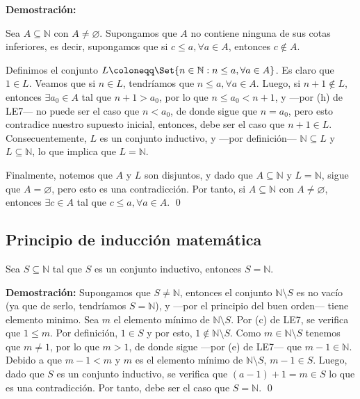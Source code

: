 \documentclass[11pt]{article}
\newcommand{\N}{\mathbb{N}}
\newcommand{\R}{\mathbb{R}}
\let\emptyset\varnothing
\let\set\Set
\begin{document}
\pagebreak

\textbf{Demostración:}

Sea $A\subseteq \N$ con $A\neq \emptyset$. Supongamos que $A$ no contiene ninguna de sus cotas inferiores, es decir, supongamos que si $c\leq a, \forall a\in A$, entonces $c\notin A$.

Definimos el conjunto $L\coloneqq \set{n\in \N: n\leq a, \forall a\in A}$. Es claro que $1\in L$. Veamos que si $n\in L$, tendríamos que $n\leq a, \forall a\in A$. Luego, si $n+1\notin L$, entonces $\exists a_0\in A$ tal que $n+1>a_0$, por lo que $n\leq a_0<n+1$, y —por (h) de LE7— no puede ser el caso que $n<a_0$, de donde sigue que $n=a_0$, pero esto contradice nuestro supuesto inicial, entonces, debe ser el caso que $n+1\in L$. Consecuentemente, $L$ es un conjunto inductivo, y —por definición— $\N\subseteq L$ y $L\subseteq \N$, lo que implica que $L=\N$.

Finalmente, notemos que $A$ y $L$ son disjuntos, y dado que $A\subseteq \N$ y $L=\N$, sigue que $A=\emptyset$, pero esto es una contradicción. Por tanto, si $A\subseteq \N$ con $A\neq \emptyset$, entonces $\exists c\in A$ tal que $c\leq a, \forall a\in A$. \qed
%
%
%
%
%

\subsection*{Principio de inducción matemática}

Sea $S\subseteq \N$ tal que $S$ es un conjunto inductivo, entonces $S=\N$.

\textbf{Demostración:} Supongamos que $S\neq \N$, entonces el conjunto $\N\setminus S$ es no vacío (ya que de serlo, tendríamos $S=\N$), y —por el principio del buen orden— tiene elemento minimo. Sea $m$ el elemento mínimo de $\N\setminus S$. Por (c) de LE7, se verifica que $1 \leq m$. Por definición, $1\in S$ y por esto, $1\notin \N\setminus S$. Como $m\in \N\setminus S$ tenemos que $m\neq 1$, por lo que $m>1$, de donde sigue —por (e) de LE7— que $m-1\in \N$. Debido a que $m-1<m$ y $m$ es el elemento mínimo de $\N \setminus S$, $m-1\in S$. Luego, dado que $S$ es un conjunto inductivo, se verifica que $(a-1)+1=m\in S$ lo que es una contradicción. Por tanto, debe ser el caso que $S=\N$. \qed
\end{document}
